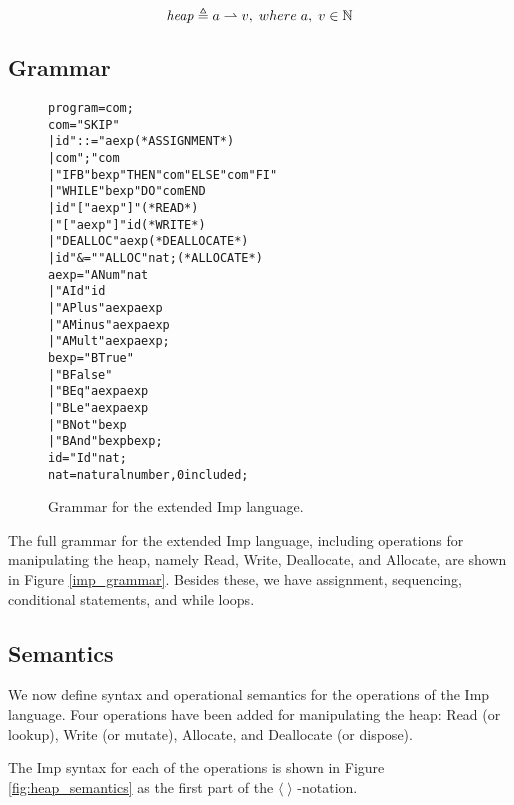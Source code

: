 \[
\mathit{heap} \mathrel{\triangleq} a\rightharpoonup v, \; where\; a, \;v \in \mathbb{N}
\] 

\subsection{Grammar}

\begin{figure}
\begin{alltt}
                  program = com ;
                  com =   "SKIP"
                        | id "::=" aexp            (* ASSIGNMENT *)
                        | com ";" com
                        | "IFB" bexp "THEN" com "ELSE" com "FI"
                        | "WHILE" bexp "DO" com END
                        | id \lsquigarr "[" aexp "]"       (* READ *)
                        | "[" aexp "]" \lsquigarr id       (* WRITE *)
                        | "DEALLOC" aexp           (* DEALLOCATE *)
                        | id "&=" "ALLOC" nat ;    (* ALLOCATE *)
                  aexp =  "ANum" nat
                        | "AId" id
                        | "APlus" aexp aexp
                        | "AMinus" aexp aexp
                        | "AMult" aexp aexp ;
                  bexp =  "BTrue"
                        | "BFalse"
                        | "BEq" aexp aexp
                        | "BLe" aexp aexp
                        | "BNot" bexp
                        | "BAnd" bexp bexp ;
                  id = "Id" nat ;
                  nat = natural number, 0 included ;
\end{alltt}
\label{fig:imp_grammar}
\caption{Grammar for the extended Imp language.}
\end{figure}

The full grammar for the extended Imp language, including operations for manipulating the heap, namely Read, Write, Deallocate, and Allocate, are shown in Figure \ref{imp_grammar}. Besides these, we have assignment, sequencing, conditional statements, and while loops. 

\subsection{Semantics}
\label{sec:semantics}
We now define syntax and operational semantics for the operations of the Imp language. Four operations have been added for manipulating the heap: Read (or lookup), Write (or mutate), Allocate, and Deallocate (or dispose).

The Imp syntax for each of the operations is shown in Figure \ref{fig:heap_semantics} as the first part of the $\langle \; \rangle$  -notation. 
